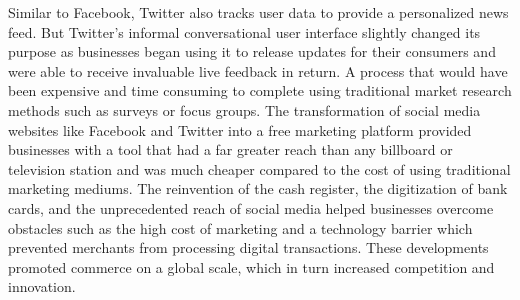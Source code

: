 \documentclass{article}
\begin{document}
Similar to Facebook, Twitter also tracks user data to provide a personalized news feed. But Twitter’s informal conversational user interface slightly changed its purpose as businesses began using it to release updates for their consumers and were able to receive invaluable live feedback in return. A process that would have been expensive and time consuming to complete using traditional market research methods such as surveys or focus groups. The transformation of social media websites like Facebook and Twitter into a free marketing platform provided businesses with a tool that had a far greater reach than any billboard or television station and was much cheaper compared to the cost of using traditional marketing mediums. The reinvention of the cash register, the digitization of bank cards, and the unprecedented reach of social media helped businesses overcome obstacles such as the high cost of marketing and a technology barrier which prevented merchants from processing digital transactions. These developments promoted commerce on a global scale, which in turn increased competition and innovation.
\end{document}
